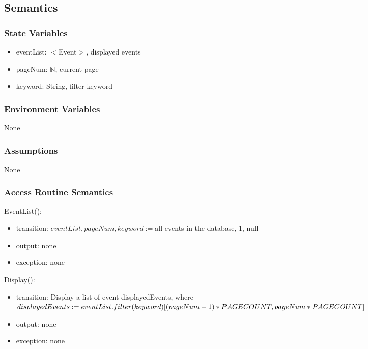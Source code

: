 \documentclass[12pt, titlepage]{article}
\begin{document}
\subsection{Semantics}

\subsubsection{State Variables}

\begin{itemize}
\item eventList: $<$Event$>$, displayed events
\item pageNum: $\mathbb{N}$, current page
\item keyword: String, filter keyword
\end{itemize}

\subsubsection{Environment Variables}

None

\subsubsection{Assumptions}

None

\subsubsection{Access Routine Semantics}

\noindent EventList():
\begin{itemize}
\item transition: $eventList, pageNum, keyword := $all events in the database, 1, null
\item output: none
\item exception: none
\end{itemize}

\noindent Display():
\begin{itemize}
\item transition: Display a list of event displayedEvents, where $displayedEvents := \\eventList.filter(keyword)[(pageNum-1) * PAGECOUNT, pageNum * PAGECOUNT]$
\item output: none
\item exception: none
\end{itemize}
\end{document}
